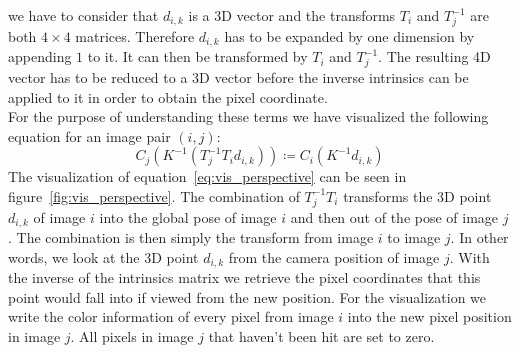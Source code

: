         we have to consider that $d_{i,k}$ is a 3D vector and the transforms $T_i$ and $T_j^{-1}$ are both $4 \times 4$ matrices.
        Therefore $d_{i,k}$ has to be expanded by one dimension by appending $1$ to it.
        It can then be transformed by $T_i$ and $T_j^{-1}$.
        The resulting 4D vector has to be reduced to a 3D vector before the inverse intrinsics can be applied to it in order to obtain the pixel coordinate.\\
        For the purpose of understanding these terms we have visualized the following equation for an image pair $(i, j)$:
        \begin{equation}
            C_j(K^{-1}(T_j^{-1}T_id_{i,k})) \coloneqq C_i(K^{-1}d_{i,k})
            \label{eq:vis_perspective}
        \end{equation}
        The visualization of equation~\ref{eq:vis_perspective} can be seen in figure~\ref{fig:vis_perspective}.
        The combination of $T_j^{-1}T_i$ transforms the 3D point $d_{i,k}$ of image $i$ into the global pose of image $i$ and then out of the pose of image $j$.
        The combination is then simply the transform from image $i$ to image $j$.
        In other words, we look at the 3D point $d_{i,k}$ from the camera position of image $j$.
        With the inverse of the intrinsics matrix we retrieve the pixel coordinates that this point would fall into if viewed from the new position.
        For the visualization we write the color information of every pixel from image $i$ into the new pixel position in image $j$.
        All pixels in image $j$ that haven't been hit are set to zero.
